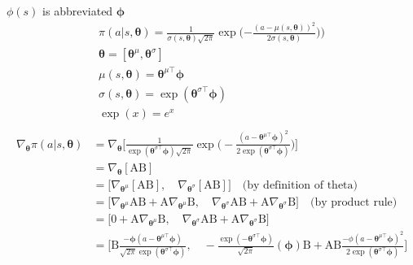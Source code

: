 \documentclass{article}
\begin{document}
$\phi(s)$ is abbreviated $\bm{\phi}$
\begin{gather*}
\pi (a | s, \bm{\theta}) =  \frac{1}{\sigma(s, \bm{\theta})\sqrt{2\pi}}\exp\bigg({-\frac{(a - \mu(s, {\bm{\theta}}))^2}{2\sigma(s, \bm{\theta})})}\bigg)\\
\bm{\theta} = [\bm{\theta}^\mu, \bm{\theta}^\sigma] \\
\mu(s, \bm{\theta}) = \bm{\theta}^{\mu\top}\bm{\phi}\\
\sigma(s, \bm{\theta}) = \exp(\bm{\theta}^{\sigma\top}\bm{\phi})\\
\exp(x) = e^x\\
\end{gather*}
\begin{align*}
\nabla_{\bm{\theta}} \pi (a | s, \bm{\theta}) &= \nabla_{\bm{\theta}} \bigg[ \frac{1}{\exp(\bm{\theta}^
	{\sigma\top}\bm{\phi})\sqrt{2\pi}}\exp\bigg(- \frac{(a - \bm{\theta}^{\mu\top}\bm{\phi})^2}{2\exp(\bm{\theta}^{\sigma\top}\bm{\phi})}\bigg)\bigg]\\
&= \nabla_{\bm{\theta}}[\text{AB}] \\
&= \big[\nabla_{\bm{\theta}^\mu}[\text{AB}],\quad\nabla_{\bm{\theta}^\sigma}[\text{AB}]\big]  \quad\text{(by definition of theta)}\\
&= \big[\nabla_{\bm{\theta}^\mu}\text{A}\text{B} + \text{A}\nabla_{\bm{\theta}^\mu}\text{B} ,\quad \nabla_{\bm{\theta}^\sigma}\text{A}\text{B} + \text{A}\nabla_{\bm{\theta}^\sigma}\text{B}\big]  \quad\text{(by product rule)}\\
&= \big[0 + \text{A}\nabla_{\bm{\theta}^\mu}\text{B} ,\quad \nabla_{\bm{\theta}^\sigma}\text{A}\text{B} + \text{A}\nabla_{\bm{\theta}^\sigma}\text{B}\big] \\
&= \big[\text{B} \frac{{-\bm{\phi}}(a - \bm{\theta}^{\mu\top}\bm{\phi}) }{\sqrt{2\pi}\exp(\bm{\theta}^{\sigma\top}\bm{\phi})} ,\quad -\frac{\exp(-\bm{\theta}^
	{\sigma\top}\bm{\phi})}{\sqrt{2\pi}} (\bm{\phi})\text{B} + \text{A}\text{B}\frac{{-\phi} (a - \bm{\theta}^{\mu\top}\bm{\phi})^2}{2\exp(\bm{\theta}^{\sigma\top}\bm{\phi})}\big] \\
 \\
\end{align*}
\end{document}
